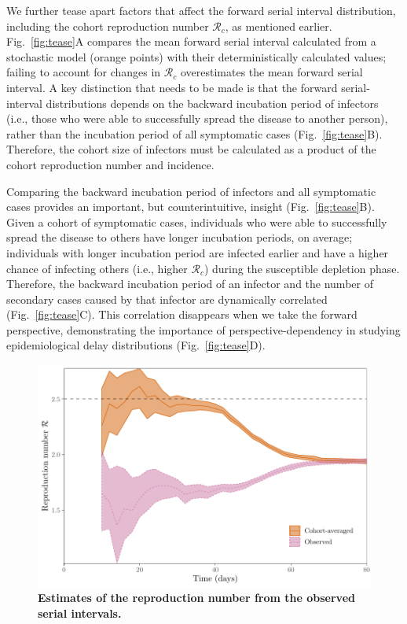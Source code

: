 \documentclass[12pt]{article}
\newcommand{\fref}[1]{Fig.~\ref{fig:#1}}
\begin{document}
We further tease apart factors that affect the forward serial interval distribution, including the cohort reproduction number $\mathcal R_c$, as mentioned earlier.
\fref{tease}A compares the mean forward serial interval calculated from a stochastic model (orange points) with their deterministically calculated values;
failing to account for changes in $\mathcal R_c$ overestimates the mean forward serial interval.
A key distinction that needs to be made is that the forward serial-interval distributions depends on the backward incubation period of infectors (i.e., those who were able to successfully spread the disease to another person), rather than the incubation period of all symptomatic cases (\fref{tease}B).
Therefore, the cohort size of infectors must be calculated as a product of the cohort reproduction number and incidence.

Comparing the backward incubation period of infectors and all symptomatic cases provides an important, but counterintuitive, insight (\fref{tease}B).
Given a cohort of symptomatic cases, individuals who were able to successfully spread the disease to others have longer incubation periods, on average;
individuals with longer incubation period are infected earlier and have a higher chance of infecting others (i.e., higher $\mathcal R_c$) during the susceptible depletion phase.
Therefore, the backward incubation period of an infector and the number of secondary cases caused by that infector are dynamically correlated (\fref{tease}C).
This correlation disappears when we take the forward perspective, demonstrating the importance of perspective-dependency in studying epidemiological delay distributions (\fref{tease}D).

\begin{figure}[!th]
\includegraphics[width=\textwidth]{observedrR.pdf}
\caption{
\textbf{Estimates of the reproduction number from the observed serial intervals.}
}
\label{fig:obsrR}
\end{figure}
\end{document}
